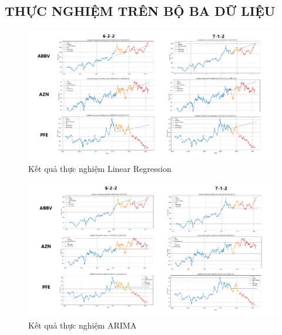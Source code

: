 \documentclass[conference]{IEEEtran}
\begin{document}
\subsection{THỰC NGHIỆM TRÊN BỘ BA DỮ LIỆU}
\begin{figure}[H]
    \centering
    \begin{minipage}{0.5\textwidth}
    \centering
    \includegraphics[width=1\textwidth]{Image/LinearRegression.png}
    \caption{Kết quả thực nghiệm Linear Regression}
    \label{fig:1}
    \end{minipage}
\end{figure}
\begin{figure}[H]
    \centering
    \begin{minipage}{0.5\textwidth}
    \centering
    \includegraphics[width=1\textwidth]{Image/ARIMA.png}
    \caption{Kết quả thực nghiệm ARIMA}
    \label{fig:1}
    \end{minipage}
\end{figure}
\end{document}
